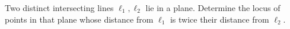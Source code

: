 Two distinct intersecting lines $\ell_1,\ell_2$ lie in a plane. Determine the locus of points in that plane whose distance from $\ell_1$ is twice their distance from $\ell_2$.
